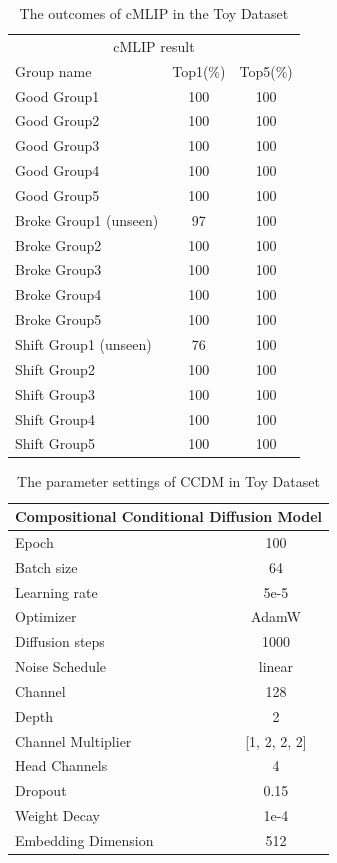 \begin{table}[H]
    \centering
    \renewcommand{\arraystretch}{1} %
    \begin{tabular}[h]{lcc} \hline 
        \multicolumn{3}{c}{cMLIP result} \\ 
        Group name& Top1(\%) & Top5(\%)\\ \hline
        Good Group1 & 100 & 100\\ 
        Good Group2 & 100 & 100\\ 
        Good Group3 & 100 & 100\\ 
        Good Group4 & 100 & 100\\ 
        Good Group5 & 100 & 100\\ 
        Broke Group1 (unseen) & 97 & 100\\ 
        Broke Group2 & 100 & 100\\ 
        Broke Group3 & 100 & 100\\ 
        Broke Group4 & 100 & 100\\ 
        Broke Group5 & 100 & 100\\ 
        Shift Group1 (unseen) & 76 & 100\\ 
        Shift Group2 & 100 & 100\\ 
        Shift Group3 & 100 & 100\\ 
        Shift Group4 & 100 & 100\\ 
        Shift Group5 & 100 & 100\\ \hline 
    \end{tabular}
    \caption{The outcomes of cMLIP in the Toy Dataset }
    \label{tab:experimental_config}
\end{table}
\begin{table}[H]
    \centering
    \renewcommand{\arraystretch}{1} %
    \begin{tabular}[h]{lc} \hline 
        \multicolumn{2}{c}{Compositional Conditional Diffusion Model} \\ \hline
        Epoch & 100\\ 
        Batch size &  64\\ 
        Learning rate & 5e-5\\ 
        Optimizer & AdamW\\ 
        Diffusion steps & 1000\\ 
        Noise Schedule & linear \\ 
        Channel & 128 \\
        Depth & 2 \\ 
        Channel Multiplier & [1, 2, 2, 2]\\ 
        Head Channels & 4\\ 
        Dropout & 0.15\\
        Weight Decay & 1e-4\\
        Embedding Dimension & 512 \\ \hline 
    \end{tabular}
    \caption{The parameter settings of  CCDM in Toy Dataset}
    \label{tab:experimental_config}
\end{table}
